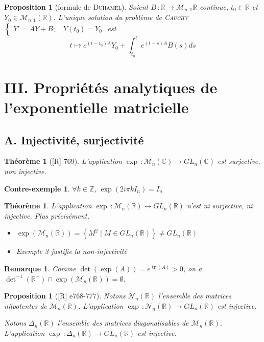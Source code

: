 \documentclass[10pt, a4paper, parskip=full, twoside, twocolumn]{report}
\newtheorem{theorem}[definition]{Théorème}
\newtheorem{proposition}[definition]{Proposition}
\newtheorem{cexample}[definition]{Contre-exemple}
\newtheorem{remark}[definition]{Remarque}
\newcommand{\IZ}{\mathbb{Z}}
\newcommand{\IC}{\mathbb{C}}
\newcommand{\IR}{\mathbb{R}}
\DeclareMathOperator{\tr}{tr}
\begin{document}
\begin{proposition}[formule de \textsc{Duhamel}]
	Soient $B\,\colon \IR\to \mathcal{M}_{n,1}{\IR}$ continue, $t_0\in\IR$ et $Y_0\in\mathcal{M}_{n,1}(\IR)$.
	L'unique solution du problème de \textsc{Cauchy}
	$\begin{cases}
		Y' = AY + B ;\quad Y(t_0) = Y_0
	\end{cases}$ est 
	$$t\mapsto e^{(t-t_0)A}Y_0 + \int_{t_0}^t e^{(t-s)A}B(s)ds$$
\end{proposition}


\section*{III. Propriétés analytiques de l'exponentielle matricielle}
\subsection*{A. Injectivité, surjectivité}

\begin{theorem}[\textnormal{[R] 769}]
	L'application $\exp\,\colon \mathcal{M}_n(\IC)\to GL_n(\IC)$ est surjective, non injective.
\end{theorem}

\begin{cexample}
	$\forall k\in\IZ$, $\exp(2i\pi kI_n)= I_n$
\end{cexample}

\begin{theorem}
	L'application $\exp\,\colon \mathcal{M}_n(\IR)\to GL_n(\IR)$ n'est ni surjective, ni injective.
	Plus précisément,
	\begin{itemize}
		\item $\exp(\mathcal{M}_n(\IR)) = \left\{M^2 \mid M\in GL_n(\IR)\right\} \neq GL_n(\IR)$
		\item Exemple 3 justifie la non-injectivité
	\end{itemize}
\end{theorem}

\begin{remark}
	Comme $\det(\exp(A)) = e^{\tr (A)} > 0$, on a $\det^{-1}(\IR^-)\cap \exp(\mathcal{M}_n(\IR)) = \emptyset$.
\end{remark}

\begin{proposition}[\textnormal{[R] e768-777}]
	Notons $\mathcal{N}_n(\IR)$ l'ensemble des matrices nilpotentes de $\mathcal{M}_n(\IR)$.
	L'application $\exp\,\colon \mathcal{N}_n(\IR) \to GL_n(\IR)$ est injective.

	Notons $\Delta_n(\IR)$ l'ensemble des matrices diagonalisables de $\mathcal{M}_n(\IR)$.
	L'application $\exp\,\colon \Delta_n(\IR)\to  GL_n(\IR)$ est injective.
\end{proposition}
\end{document}
